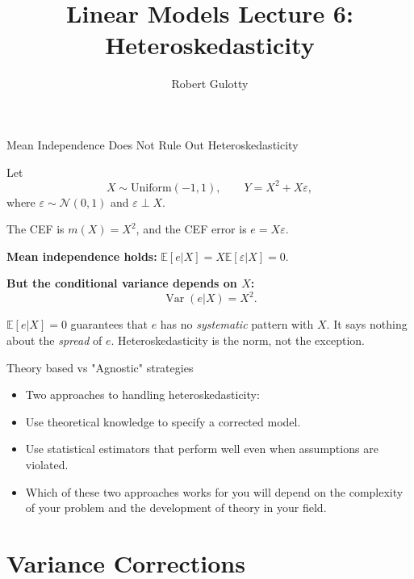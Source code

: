 \documentclass[aspectratio=169, handout, t]{beamer}
\title[PLSC 30700]{Linear Models Lecture 6: Heteroskedasticity}
\author{Robert Gulotty}
\institute[Chicago]{University of Chicago}
\numberwithin{equation}{section}
\begin{document}
\begin{frame}
\maketitle
\end{frame}

\begin{frame}{Mean Independence Does Not Rule Out Heteroskedasticity}

Let
\[
X \sim \text{Uniform}(-1,1),
\qquad
Y = X^2 + X\varepsilon,
\]
where $\varepsilon \sim \mathcal{N}(0,1)$ and $\varepsilon \perp X$.

\medskip

The CEF is $m(X)=X^2$, and the CEF error is $e = X\varepsilon$.

\medskip
\textbf{Mean independence holds:}\quad
$\mathbb{E}[e|X]
= X\mathbb{E}[\varepsilon|X]
= 0.$

\medskip\pause
\textbf{But the conditional variance depends on $X$:}
\[
\operatorname{Var}(e|X)
= X^2.
\]

\pause
\medskip
\begin{tcolorbox}[colback=blue!5, colframe=blue!50]
$\mathbb{E}[e|X]=0$ guarantees that $e$ has no \emph{systematic} pattern with $X$.  It says nothing about the \emph{spread} of $e$.  Heteroskedasticity is the norm, not the exception.
\end{tcolorbox}
\end{frame}

\begin{frame}{Theory based vs "Agnostic" strategies}
\begin{itemize}
\item Two approaches to handling heteroskedasticity:
\item[1)] Use theoretical knowledge to specify a corrected model.
\item[2)] Use statistical estimators that perform well even when assumptions are violated.
\item Which of these two approaches works for you will depend on the complexity of your problem and the development of theory in your field.
\end{itemize}
\end{frame}


\section{Variance Corrections}
\end{document}
